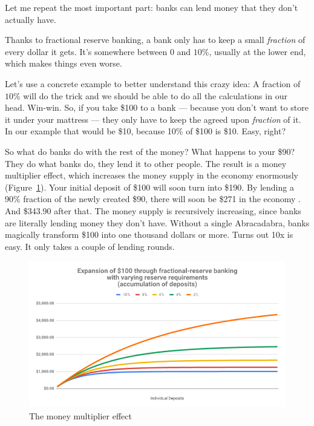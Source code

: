Let me repeat the most important part: banks can lend money that they
don't actually have.

Thanks to fractional reserve banking, a bank only has to keep a small
\textit{fraction} of every dollar it gets. It's somewhere between $0$ and $10\%$,
usually at the lower end, which makes things even worse.

Let's use a concrete example to better understand this crazy idea: A
fraction of $10\%$ will do the trick and we should be able to do all the
calculations in our head. Win-win. So, if you take \$100 to a
bank --- because you don't want to store it under your mattress --- they
only have to keep the agreed upon \textit{fraction} of it. In our example that
would be \$10, because 10\% of \$100 is \$10. Easy, right?

So what do banks do with the rest of the money? What happens to your \$90? They
do what banks do, they lend it to other people. The result is a money multiplier
effect, which increases the money supply in the economy enormously
(Figure~\ref{fig:money-multiplier}). Your initial deposit of \$100 will soon
turn into \$190. By lending a 90\% fraction of the newly created \$90, there
will soon be \$271 in the economy \cite{wiki:money-multiplier}. And \$343.90 after that. The money supply is
recursively increasing, since banks are literally lending money they don't have.
Without a single Abracadabra, banks magically transform \$100 into one thousand
dollars or more. Turns out 10x is easy. It only takes a couple of lending
rounds.

\begin{figure}
  \centering
  \includegraphics{assets/images/money-multiplier.png}
  \caption{The money multiplier effect}
  \label{fig:money-multiplier}
\end{figure}

